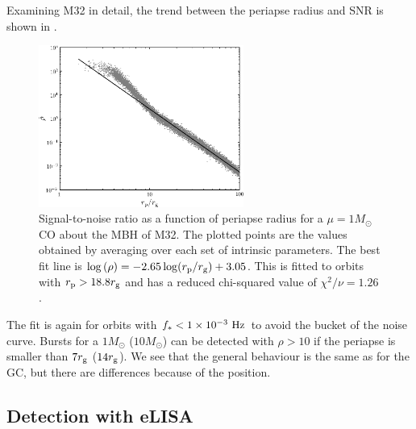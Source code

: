 Examining M32 in detail, the trend between the periapse radius and SNR is shown in .
\begin{figure}[!htp]
  \begin{center}
  \includegraphics[width=0.6\textwidth]{./images/Fig_SNR_M32}
    \caption{Signal-to-noise ratio as a function of periapse radius for a $\mu = 1 M_\odot$ CO about the MBH of M32. The plotted points are the values obtained by averaging over each set of intrinsic parameters. The best fit line is $\log\left(\rho\right) = -2.65\log(r_\mathrm{p}/r_\mathrm{g}) + 3.05$. This is fitted to orbits with $r_\mathrm{p} > 18.8 r_\mathrm{g}$ and has a reduced chi-squared value of $\chi^2/\nu = 1.26$.\label{fig:SNR-M32}}
  \end{center}
\end{figure}
The fit is again for orbits with $f_\ast < 1 \times 10^{-3}~\mathrm{Hz}$ to avoid the bucket of the noise curve. Bursts for a $1 M_\odot$ ($10 M_\odot$) can be detected with $\rho > 10$ if the periapse is smaller than $7 r_\mathrm{g}$ ($14 r_\mathrm{g}$). We see that the general behaviour is the same as for the GC, but there are differences because of the position.

\subsection{Detection with eLISA}


